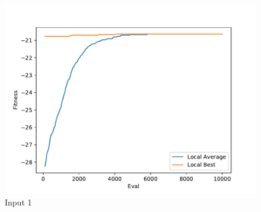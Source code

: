 \documentclass{standalone}
\begin{document}
\begin{figure}[!htb]
	\caption{Input 1}
	\label{fig:graph_1059}
	\includegraphics[width=\textwidth]{../graphs/graphs/1059.pdf}
\end{figure}
\end{document}
